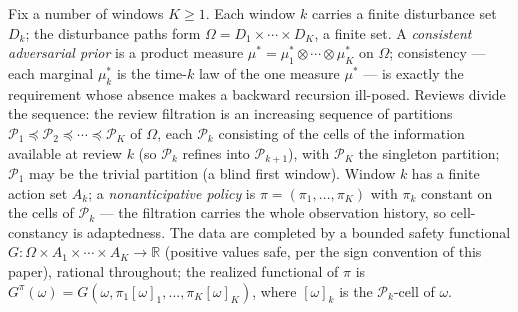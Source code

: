 \documentclass[10pt,twocolumn]{article}
\theoremstyle{plain}
\theoremstyle{definition}
\theoremstyle{remark}
\begin{document}
Fix a number of windows $K \ge 1$. Each window $k$ carries a finite
disturbance set $D_{k}$; the disturbance paths form
$\Omega = D_{1} \times \cdots \times D_{K}$, a finite set. A
\emph{consistent adversarial prior} is a product measure
$\mu^{*} = \mu^{*}_{1} \otimes \cdots \otimes \mu^{*}_{K}$ on $\Omega$;
consistency --- each marginal $\mu^{*}_{k}$ is the time-$k$ law of the one measure $\mu^{*}$ --- is exactly the requirement whose absence makes a backward recursion ill-posed. Reviews divide the sequence: the review
filtration is an increasing sequence of partitions
$\mathcal{P}_{1} \preceq \mathcal{P}_{2} \preceq \cdots \preceq
\mathcal{P}_{K}$ of $\Omega$, each $\mathcal{P}_{k}$ consisting of the
cells of the information available at review $k$ (so
$\mathcal{P}_{k}$ refines into $\mathcal{P}_{k+1}$), with
$\mathcal{P}_{K}$ the singleton partition; $\mathcal{P}_{1}$ may be the
trivial partition (a blind first window). Window $k$ has a finite action
set $A_{k}$; a \emph{nonanticipative policy} is
$\pi = (\pi_{1}, \dots, \pi_{K})$ with $\pi_{k}$ constant on the cells
of $\mathcal{P}_{k}$ --- the filtration carries the whole observation
history, so cell-constancy is adaptedness. The data are completed by a
bounded safety functional $G: \Omega \times A_{1} \times \cdots \times
A_{K} \to \mathbb{R}$ (positive values safe, per the sign convention of
this paper), rational throughout; the realized functional of $\pi$ is
$G^{\pi}(\omega) = G(\omega, \pi_{1}[\omega]_{1}, \dots,
\pi_{K}[\omega]_{K})$, where $[\omega]_{k}$ is the
$\mathcal{P}_{k}$-cell of $\omega$.
\end{document}

